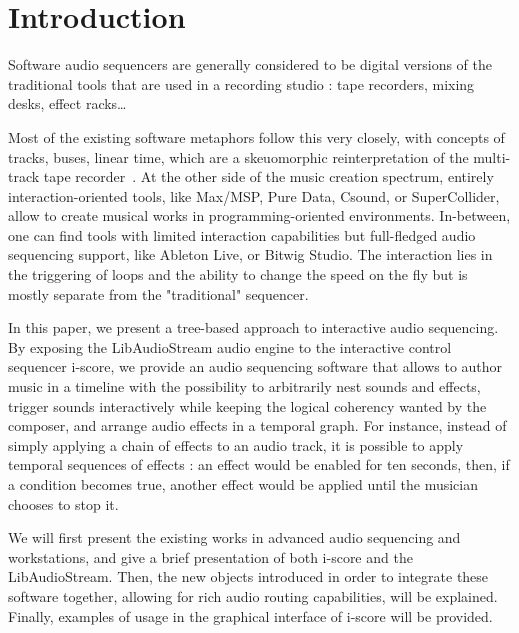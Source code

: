 \documentclass{article}
\title{\papertitle}
\begin{document}
%
\capstartfalse
\maketitle
\capstarttrue
%
\begin{abstract}
Place your abstract at the top left column on the first page.
Please write about 150--200 words that specifically highlight the purpose of your work,
its context, and provide a brief synopsis of your results.
Avoid equations in this part.
\end{abstract}

\section{Introduction}
Software audio sequencers are generally considered to be digital versions 
of the traditional tools that are used in a recording studio : tape recorders, 
mixing desks, effect racks\dots

Most of the existing software metaphors follow this very closely, with 
concepts of tracks, buses, linear time, which are a skeuomorphic reinterpretation of the multi-track tape recorder~\cite{bell2015skeuomorphism}.
At the other side of the music creation spectrum, entirely interaction-oriented tools, 
like Max/MSP, Pure Data, Csound, or SuperCollider, allow to create musical works in programming-oriented 
environments.
In-between, one can find tools with limited interaction capabilities but full-fledged audio sequencing support, 
like Ableton Live, or Bitwig Studio.
The interaction lies in the triggering of loops and the ability to change the speed on the fly but is mostly separate from the "traditional" sequencer.

In this paper, we present a tree-based approach to interactive audio sequencing.
By exposing the LibAudioStream audio engine to the interactive control sequencer i-score, 
we provide an audio sequencing software that allows to author music in a timeline 
with the possibility to arbitrarily nest sounds and effects, trigger sounds interactively 
while keeping the logical coherency wanted by the composer, and arrange audio effects in a temporal graph.
For instance, instead of simply applying a chain of effects to an audio track, it is possible to apply temporal sequences of effects : an effect would be enabled for ten seconds, then, if a condition becomes true, another effect would be applied until the musician chooses to stop it.

We will first present the existing works in advanced audio sequencing and workstations, 
and give a brief presentation of both i-score and the LibAudioStream.
Then, the new objects introduced in order to integrate these software together, allowing 
for rich audio routing capabilities, will be explained.
Finally, examples of usage in the graphical interface of i-score will be provided.
\end{document}

